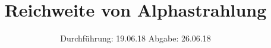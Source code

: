 

\subject{V701}
\title{Reichweite von Alphastrahlung}
\date{%
  Durchführung: 19.06.18
  \hspace{3em}
  Abgabe: 26.06.18
}



\maketitle
\thispagestyle{empty}
\tableofcontents
\newpage
\setlength{\parindent}{0em}






\printbibliography{}



